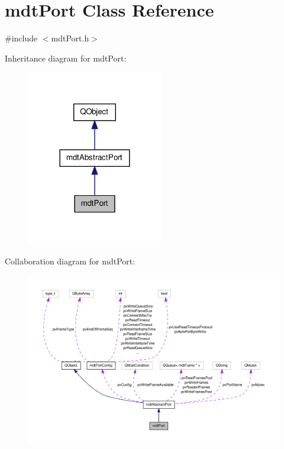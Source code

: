 \hypertarget{classmdt_port}{\section{mdt\-Port Class Reference}
\label{classmdt_port}
}


{\ttfamily \#include $<$mdt\-Port.\-h$>$}



Inheritance diagram for mdt\-Port\-:
\nopagebreak
\begin{figure}[H]
\begin{center}
\leavevmode
\includegraphics[width=168pt]{classmdt_port__inherit__graph}
\end{center}
\end{figure}


Collaboration diagram for mdt\-Port\-:
\nopagebreak
\begin{figure}[H]
\begin{center}
\leavevmode
\includegraphics[width=350pt]{classmdt_port__coll__graph}
\end{center}
\end{figure}
